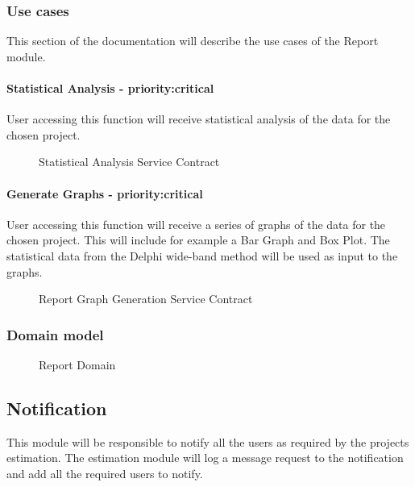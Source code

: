 \subsubsection{Use cases}
	This section of the documentation will describe the use cases of the Report module.
	\paragraph{Statistical Analysis - priority:critical}
	User accessing this function will receive statistical analysis of the data for the chosen project.
	\begin{figure}[H]
	    	\centering
	    	\caption{Statistical Analysis Service Contract}
	    	\label{fig:Report_getStatistics.png Contract}
   	\end{figure}
	\paragraph{Generate Graphs - priority:critical}
	User accessing this function will receive a series of graphs of the data for the chosen project. 
	This will include for example a Bar Graph and Box Plot. The statistical data from the Delphi wide-band method 
	will be used as input to the graphs.
	\begin{figure}[H]
	    	\centering
	    	\caption{Report Graph Generation Service Contract}
	    	\label{fig:Report_GraphGeneration.png Contract}
   	\end{figure}

\subsubsection{Domain model}
	\begin{figure}[H]
	    	\centering
	    	\caption{Report Domain}
	    	\label{fig:Report_Domain.png}
   	\end{figure}
\subsection{Notification}
This module will be responsible to notify all the users as required by the projects estimation. The estimation module will log a message request to the notification and add all the required users to notify.
